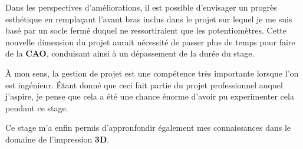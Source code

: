 \vspace{0.5cm}
Dans les perspectives d'améliorations, il est possible d'envisager un progrès esthétique en remplaçant l'avant bras inclus dans le projet sur lequel je me suis basé par un socle fermé duquel ne ressortiraient que les potentiomètres. Cette nouvelle dimension du projet aurait nécessité de passer plus de temps pour faire de la \textbf{CAO}, conduisant ainsi à un dépassement de la durée du stage.

\vspace{0.5cm}
À mon sens, la gestion de projet est une compétence très importante lorsque l'on est ingénieur. \'Etant donné que ceci fait partie du projet professionnel auquel j'aspire, je pense que cela a été une chance énorme d'avoir pu experimenter cela pendant ce stage.

\vspace{0.5cm}
Ce stage m'a enfin permis d'appronfondir également mes connaissances dans le domaine de l'impression \textbf{3D}.



